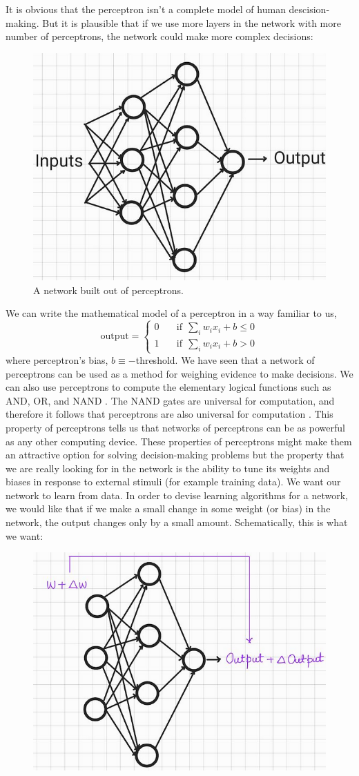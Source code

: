 It is obvious that the perceptron isn't a complete model of human descision-making. But it is plausible that if we use more layers in the network
with more number of perceptrons, the network could make more complex decisions:
\begin{figure}[htbp]
    \centering
    \includegraphics[width=.4\textwidth]{Figures/perceptron_network.png}
    \caption{A network built out of perceptrons.}
    \label{fig:percep_net}
\end{figure} 
We can write the mathematical model of a perceptron in a way familiar to us, 
\begin{equation*}
    \text{output} = 
     \begin{cases}
       0 &\quad \text{if} \ \ \sum_i w_i x_i + b \leq 0 \\
       1 &\quad  \text{if} \ \ \sum_i w_i x_i + b > 0 
     \end{cases}
\end{equation*}
where perceptron's bias, $b \equiv -$threshold. We have seen that a network of perceptrons can be used as 
a method for weighing evidence to make decisions. We can also use perceptrons to compute the elementary logical functions such as
AND, OR, and NAND \cite{nielsen2015neural}. The NAND gates are universal for computation, and therefore it follows that perceptrons are also universal for
computation \cite{nielsen2015neural}. This property of perceptrons tells us that networks of perceptrons can be as powerful as any other computing device. These 
properties of perceptrons might make them an attractive option for solving decision-making problems but the property that we 
are really looking for in the network is the ability to tune its weights and biases in response to external stimuli (for example training data).
We want our network to learn from data. In order to devise learning algorithms for a network, we would like that if we make 
a small change in some weight (or bias) in the network, the output changes only by a small amount. Schematically, this is what we want:
\begin{figure}[htbp]
    \centering
    \includegraphics[width=.4\textwidth]{Figures/precepnet2.png}
\end{figure}
 
